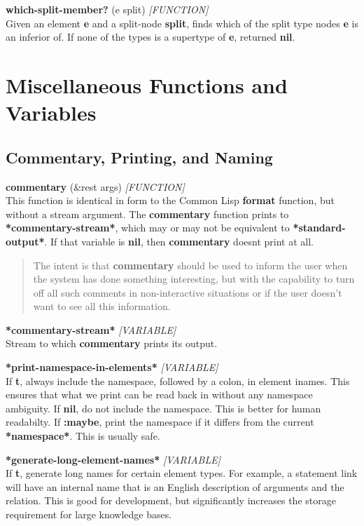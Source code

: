 \documentclass[titlepage,twoside,openright,11pt]{article}
\begin{document}
\textbf{which-split-member?} (e split) \emph{{[}FUNCTION{]}}\\
Given an element \textbf{e} and a split-node \textbf{split}, finds which
of the split type nodes \textbf{e} is an inferior of. If none of the
types is a supertype of \textbf{e}, returned \textbf{nil}.

\section{Miscellaneous Functions and
Variables}\label{miscellaneous-functions-and-variables}

\subsection{Commentary, Printing, and
Naming}\label{commentary-printing-and-naming}

\textbf{commentary} (\&rest args) \emph{{[}FUNCTION{]}}\\
This function is identical in form to the Common Lisp \textbf{format}
function, but without a stream argument. The \textbf{commentary}
function prints to \textbf{*commentary-stream*}, which may or may not be
equivalent to \textbf{*standard-output*}. If that variable is
\textbf{nil}, then \textbf{commentary} doesn\textquotesingle t print at
all.

\begin{quote}
The intent is that \textbf{commentary} should be used to inform the user
when the system has done something interesting, but with the capability
to turn off all such comments in non-interactive situations or if the
user doesn't want to see all this information.
\end{quote}

\textbf{*commentary-stream*} \emph{{[}VARIABLE{]}}\\
Stream to which \textbf{commentary} prints its output.

\textbf{*print-namespace-in-elements*} \emph{{[}VARIABLE{]}}\\
If \textbf{t}, always include the namespace, followed by a colon, in
element inames. This ensures that what we print can be read back in
without any namespace ambiguity. If \textbf{nil}, do not include the
namespace. This is better for human readabilty. If \textbf{:maybe},
print the namespace if it differs from the current \textbf{*namespace*}.
This is usually safe.

\textbf{*generate-long-element-names*} \emph{{[}VARIABLE{]}}\\
If \textbf{t}, generate long names for certain element types. For
example, a statement link will have an internal name that is an English
description of arguments and the relation. This is good for development,
but significantly increases the storage requirement for large knowledge
bases.
\end{document}
